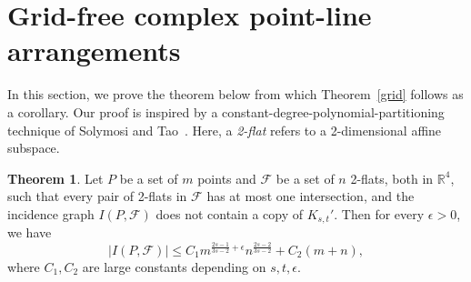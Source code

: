 \documentclass[11pt]{article}
\theoremstyle{definition}
\newtheorem{theorem}{Theorem}[section]
\begin{document}
\section{Grid-free complex point-line arrangements}\label{sec_grid}

In this section, we prove the theorem below from which Theorem~\ref{grid} follows as a corollary. Our proof is inspired by a constant-degree-polynomial-partitioning technique of Solymosi and Tao~\cite{solymosi2012incidence}. Here, a \textit{2-flat} refers to a 2-dimensional affine subspace.

\begin{theorem}\label{grid_2flat}
Let $P$ be a set of $m$ points and $\mathcal{F}$ be a set of $n$ 2-flats, both in $\mathbb{R}^4$, such that every pair of 2-flats in $\mathcal{F}$ has at most one intersection, and the incidence graph $I(P,\mathcal{F})$ does not contain a copy of $K_{s,t}'$. Then for every $\epsilon > 0$, we have
\begin{equation}\label{eq:grid_2flat}
    |I(P,\mathcal{F})| \leq C_1 m^{\frac{2s-1}{3s-2}+\epsilon}n^{\frac{2s-2}{3s-2}}+C_2(m+n),
\end{equation}
where $C_1, C_2$ are large constants depending on $s,t,\epsilon$.
\end{theorem}
\end{document}
